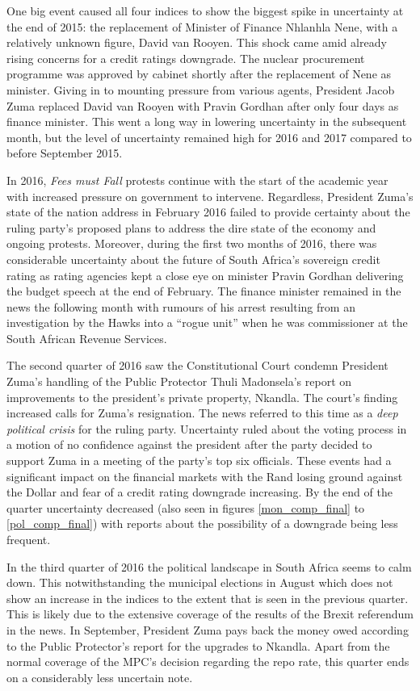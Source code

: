 \documentclass[11pt,preprint, authoryear]{elsarticle}
\numberwithin{equation}{section}
\numberwithin{figure}{section}
\numberwithin{table}{section}
\begin{document}
One big event caused all four indices to show the biggest spike in
uncertainty at the end of 2015: the replacement of Minister of Finance
Nhlanhla Nene, with a relatively unknown figure, David van Rooyen. This
shock came amid already rising concerns for a credit ratings downgrade.
The nuclear procurement programme was approved by cabinet shortly after
the replacement of Nene as minister. Giving in to mounting pressure from
various agents, President Jacob Zuma replaced David van Rooyen with
Pravin Gordhan after only four days as finance minister. This went a
long way in lowering uncertainty in the subsequent month, but the level
of uncertainty remained high for 2016 and 2017 compared to before
September 2015.

In 2016, \emph{Fees must Fall} protests continue with the start of the
academic year with increased pressure on government to intervene.
Regardless, President Zuma's state of the nation address in February
2016 failed to provide certainty about the ruling party's proposed plans
to address the dire state of the economy and ongoing protests. Moreover,
during the first two months of 2016, there was considerable uncertainty
about the future of South Africa's sovereign credit rating as rating
agencies kept a close eye on minister Pravin Gordhan delivering the
budget speech at the end of February. The finance minister remained in
the news the following month with rumours of his arrest resulting from
an investigation by the Hawks into a ``rogue unit'' when he was
commissioner at the South African Revenue Services.

The second quarter of 2016 saw the Constitutional Court condemn
President Zuma's handling of the Public Protector Thuli Madonsela's
report on improvements to the president's private property, Nkandla. The
court's finding increased calls for Zuma's resignation. The news
referred to this time as a \emph{deep political crisis} for the ruling
party. Uncertainty ruled about the voting process in a motion of no
confidence against the president after the party decided to support Zuma
in a meeting of the party's top six officials. These events had a
significant impact on the financial markets with the Rand losing ground
against the Dollar and fear of a credit rating downgrade increasing. By
the end of the quarter uncertainty decreased (also seen in figures
\ref{mon_comp_final} to \ref{pol_comp_final}) with reports about the
possibility of a downgrade being less frequent.

In the third quarter of 2016 the political landscape in South Africa
seems to calm down. This notwithstanding the municipal elections in
August which does not show an increase in the indices to the extent that
is seen in the previous quarter. This is likely due to the extensive
coverage of the results of the Brexit referendum in the news. In
September, President Zuma pays back the money owed according to the
Public Protector's report for the upgrades to Nkandla. Apart from the
normal coverage of the MPC's decision regarding the repo rate, this
quarter ends on a considerably less uncertain note.
\end{document}
